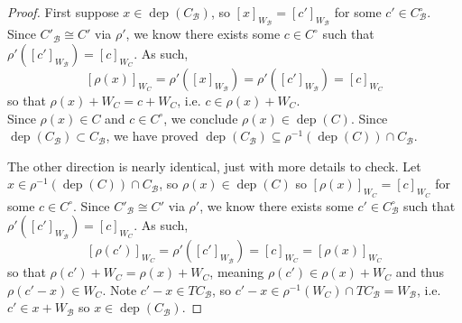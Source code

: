 \documentclass[10pt,a4paper]{amsart}
\newcommand{\B}{\mathcal{B}}
\DeclareMathOperator{\dep}{dep}
\begin{document}
\begin{proof}
	First suppose $x \in \dep(C_\B)$, so $[x]_{W_\B} = [c']_{W_\B}$ for some $c' \in C_\B^\circ$. Since $C'_\B \cong C'$ via $\rho'$, we know there exists some $c \in C^\circ$ such that $\rho'([c']_{W_\B}) = [c]_{W_C}$. As such, 
	\[[\rho(x)]_{W_C} = \rho'([x]_{W_\B}) = \rho'([c']_{W_\B}) = [c]_{W_C}\]
	so that $\rho(x) + W_C = c + W_C$, i.e. $c \in \rho(x) + W_C$.\\Since $\rho(x) \in C$ and $c \in C^\circ$, we conclude $\rho(x) \in \dep(C)$. Since $\dep(C_\B) \subset C_\B$, we have proved $\dep(C_\B) \subseteq \rho^{-1}(\dep(C)) \cap C_\B$.

	The other direction is nearly identical, just with more details to check. Let $x \in \rho^{-1}(\dep(C)) \cap C_\B$, so $\rho(x) \in \dep(C)$ so $[\rho(x)]_{W_C} = [c]_{W_C}$ for some $c \in C^\circ$. Since $C'_\B \cong C'$ via $\rho'$, we know there exists some $c' \in C_\B^\circ$ such that $\rho'([c']_{W_\B}) = [c]_{W_C}$. As such,
	\[[\rho(c')]_{W_C} = \rho'([c']_{W_\B}) = [c]_{W_C} = [\rho(x)]_{W_C}\]
	so that $\rho(c') + W_C = \rho(x) + W_C$, meaning $\rho(c') \in \rho(x) + W_C$ and thus $\rho(c' - x) \in W_C$. Note $c' - x \in TC_\B$, so $c' - x \in \rho^{-1}(W_C) \cap TC_\B = W_\B$, i.e. $c' \in x + W_\B$ so $x \in \dep(C_\B)$.
\end{proof}
\end{document}
